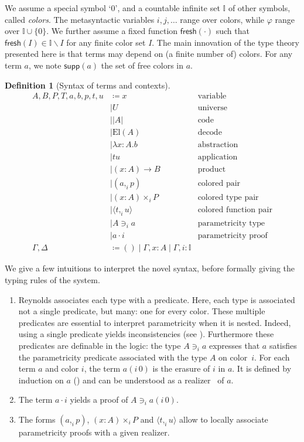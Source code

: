 \documentclass[english]{PaperTools/latex/entcs}
\theoremstyle{plain}
\theoremstyle{definition}
\newtheorem{definition}[theorem]{Definition}
\theoremstyle{remark}
\newcommand\CP[3]{(#2,_{#1} #3)}
\newcommand\CTimes[2]{(#2) ×_{#1}}
\newcommand\param[1]{\!\cdot\!#1}
\newcommand\op[1]{∋_{#1}}
\newcommand\fp[3]{⟨#2 ,_{#1} #3⟩}
\newcommand\mor[2]{({#1}\,{#2})}
\newcommand\proj[2]{{#2}\mor{#1}0}
\def\fresh#1{\mathsf{fresh}(#1)}
\def\support#1{\mathsf{supp}(#1)}
\def\El#1{\mathrm{El}(#1)}
\begin{document}
We assume a special symbol ‘0’, and a countable infinite set $𝕀$ of
other symbols, called \emph{colors}.
The metasyntactic variables $i,j,\ldots$ range over colors,
while $φ$ range over $𝕀 ∪ \{0\}$.
We further assume a fixed function $\fresh{·}$ such that
$\fresh{I} ∈ 𝕀 \backslash I$ for any finite color set $I$.
%
The main innovation of the type theory
presented here is that terms may depend on (a finite number of)
colors.  For any term $a$, we note $\support{a}$ the set of free colors
in $a$.
\begin{definition}[Syntax of terms and contexts]
  \begin{align*}
    A,B,P,T,a,b,p,t,u &
              \coloneqq x & \text {variable} \\
            & \mid U & \text{universe} \\ 
            & \mid |A| & \text{code} \\ 
            & \mid \El{A} & \text{decode} \\
            & \mid λx:A. b & \text{abstraction} \\
            & \mid t u & \text{application} \\ 
            & \mid (x:A) → B & \text{product} \\
            & \mid \CP i a p & \text{colored pair} \\
            & \mid \CTimes i {x:A} P & \text{colored type pair} \\
            & \mid \fp i t u & \text{colored function pair}\\
            & \mid A \op i a & \text{parametricity type} \\
            & \mid a \param i & \text{parametricity proof} \\
    \Gamma,\Delta & \coloneqq () \mid \Gamma,x:A \mid \Gamma,i:𝕀
  \end{align*}
\end{definition}

We give a few intuitions to interpret the novel syntax, before formally giving the typing rules of the system.
\begin{enumerate}
\item Reynolds associates each type with a
  predicate. Here, each type is associated not a single predicate, but
  many: one for every color.
  These multiple predicates are essential to interpret parametricity when
  it is nested.  Indeed, using a single predicate yields
  inconsistencies (see ).
  Furthermore these predicates are definable
  in the logic: the type $A \op i a$ expresses that $a$ satisfies
  the parametricity predicate associated with the type $A$ on color~$i$.
  For each term $a$ and color $i$, the term $\proj i a$ is the erasure
  of $i$ in $a$.  It is defined by induction on $a$
  () and can be understood as a
  realizer~\cite{bernardy_realizability_2011} of $a$.
\item The term $a \param i$ yields a proof of $A \op i \proj i a$.
\item The forms $\CP i a p$, $\CTimes i {x:A} P$ and $\fp i t u$ allow to
  locally associate parametricity proofs with a given realizer.
\end{enumerate}
\end{document}
